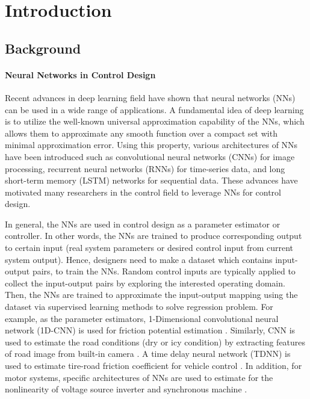 

\chapter{Introduction}

\section{Background} 

\subsubsection{Neural Networks in Control Design}

Recent advances in deep learning field have shown that neural networks (NNs) can be used in a wide range of applications. 
A fundamental idea of deep learning is to utilize the well-known universal approximation capability of the NNs, which allows them to approximate any smooth function over a compact set with minimal approximation error. 
Using this property, various architectures of NNs have been introduced such as convolutional neural networks (CNNs) for image processing, recurrent neural networks (RNNs) for time-series data, and long short-term memory (LSTM) networks for sequential data. 
These advances have motivated many researchers in the control field to leverage NNs for control design.
 
In general, the NNs are used in control design as a parameter estimator or controller.
In other words, the NNs are trained to produce corresponding output to certain input (\eg real system parameters or desired control input from current system output).
Hence, designers need to make a dataset which contains input-output pairs, to train the NNs.
Random control inputs are typically applied to collect the input-output pairs by exploring the interested operating domain.
Then, the NNs are trained to approximate the input-output mapping using the dataset via supervised learning methods to solve regression problem.
For example, as the parameter estimators, 1-Dimensional convolutional neural network (1D-CNN) is used for friction potential estimation \cite{RN109}.
Similarly, CNN is used to estimate the road conditions (\eg dry or icy condition) by extracting features of road image from built-in camera \cite{RN118}.
A time delay neural network (TDNN) is used to estimate tire-road friction coefficient for vehicle control \cite{RN107}.
In addition, for motor systems, specific architectures of NNs are used to estimate for the nonlinearity of voltage source inverter and synchronous machine \cite{RN115}.

